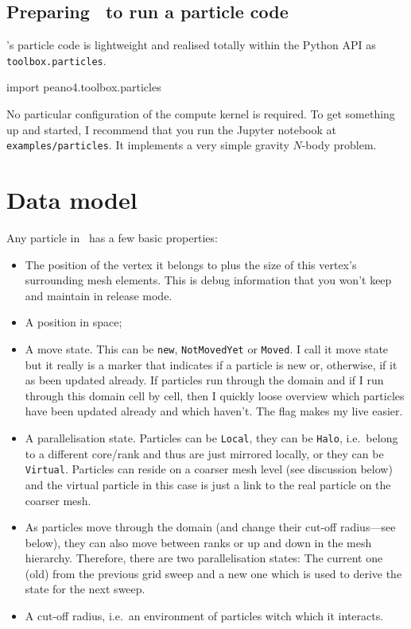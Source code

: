 \subsection*{Preparing \Peano\ to run a particle code}

\Peano's particle code is lightweight and realised totally within the Python
API as \texttt{toolbox.particles}.

\begin{code}
import peano4.toolbox.particles
\end{code}

No particular configuration of the compute kernel is required.
To get something up and started, I recommend that you run the Jupyter notebook
at \texttt{examples/particles}.
It implements a very simple gravity $N$-body problem.


\section{Data model}

Any particle in \Peano\ has a few basic properties:

\begin{itemize}
  \item The position of the vertex it belongs to plus the size of this vertex's
  surrounding mesh elements. This is debug information that you won't keep and
  maintain in release mode.
  \item A position in space;
  \item A move state. This can be \texttt{new}, \texttt{NotMovedYet} or
  \texttt{Moved}. I call it move state but it really is a marker that indicates
  if a particle is new or, otherwise, if it as been updated already. If
  particles run through the domain and if I run through this domain cell by
  cell, then I quickly loose overview which particles have been updated already
  and which haven't. The flag makes my live easier.
  \item A parallelisation state. Particles can be \texttt{Local}, they can be
  \texttt{Halo}, i.e.~belong to a different core/rank and thus are just mirrored
  locally, or they can be \texttt{Virtual}. Particles can reside on
  a coarser mesh level (see discussion below) and the virtual particle in this
  case is just a link to the real particle on the coarser mesh.
  \item As particles move through the domain (and change their cut-off
  radius---see below), they can also move between ranks or up and down in the
  mesh hierarchy. Therefore, there are two parallelisation states: The current
  one (old) from the previous grid sweep and a new one which is used to derive
  the state for the next sweep.
  \item A cut-off radius, i.e.~an environment of particles witch which it
  interacts.
\end{itemize}


